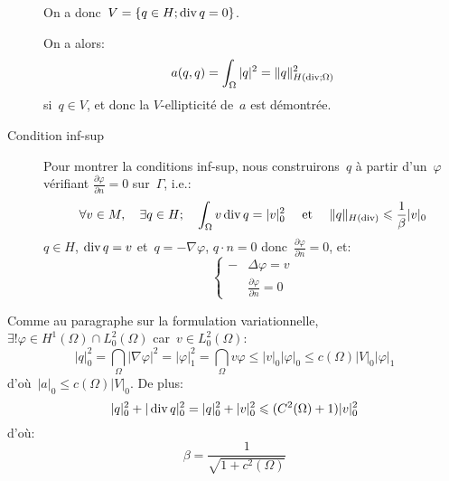\begin{description}
On a donc~$V=\left\{ q\in H; \operatorname{div} q=0\right\}$.

On a alors:
\begin{equation}a(q,q)=\displaystyle\int_\Omega |q|^2 = \|q\|^2_{H(\operatorname{div};\Omega)}\end{equation} si~$q\in V$, et donc la $V$-ellipticité de~$a$ est démontrée.

\medskip
\item[Condition inf-sup]
Pour montrer la conditions inf-sup, nous construirons~$q$ à partir d'un~$\varphi$ vérifiant $\frac{\partial\varphi}{\partial n}=0$ sur~$\Gamma$, i.e.:
\begin{equation}
\forall v\in M,\quad \exists q\in H;\quad \displaystyle\int_\Omega v \operatorname{div} q = |v|_0^2 \quad\text{ et }\quad
\|q\|_{H(\operatorname{div})}\leqslant \frac1\beta |v|_0
\end{equation}
$q\in H$, $\operatorname{div} q=v$ et~$q=-\nabla\varphi$, $q\cdot n=0$ donc~$\frac{\partial\varphi}{\partial n}=0$,
et:
\begin{equation}\left\{
\begin{aligned}
-&\Delta \varphi = v\\
&\frac{\partial \varphi}{\partial n}=0
\end{aligned}
\right.
\end{equation}
\end{description}
Comme au paragraphe sur la formulation variationnelle, $\exists!\varphi\in H^1(\Omega)\cap L^2_0(\Omega)$ car~$v\in L^2_0(\Omega)$:
\begin{equation}
|q|_0^2=\dint_\Omega |\nabla \varphi|^2 = |\varphi|_1^2 = \dint_\Omega v\varphi \le |v|_0 |\varphi|_0
\le c(\Omega) |V|_0 |\varphi|_1\end{equation} d'où~$|a|_0\le c(\Omega) |V|_0$. De plus:
\begin{equation}|q|_0^2+|\operatorname{div} q|_0^2 = |q|_0^2+|v|_0^2 \leqslant (C^2(\Omega)+1)|v|_0^2\end{equation}
d'où:
\begin{equation}\beta = \frac1{\sqrt{1+c^2(\Omega)}}\end{equation}

\medskip
{}


